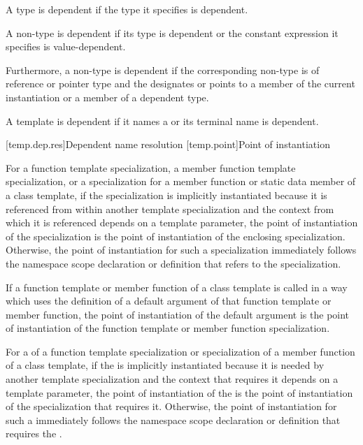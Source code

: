 \pnum
A type
is dependent if the type it specifies is dependent.

\pnum
A non-type
is dependent if its type is dependent or the constant
expression it specifies is value-dependent.

\pnum
Furthermore, a non-type
is dependent if the corresponding non-type 
is of reference or pointer type and the 
designates or points to a member of the current instantiation or a member of
a dependent type.

\pnum
A template  is dependent if
it names a  or
its terminal name is dependent.

[temp.dep.res]{Dependent name resolution}
[temp.point]{Point of instantiation}

\pnum
{}%
For a function template specialization, a member function template
specialization, or a specialization for a member function or static data member
of a class template,
if the specialization is implicitly instantiated because it is referenced
from within another template specialization and
the context from which it is referenced depends on a template parameter,
the point of instantiation of the specialization is the point of instantiation
of the enclosing specialization.
Otherwise, the point of instantiation for such a specialization immediately
follows the namespace scope declaration
or definition that refers to the specialization.

\pnum
If a function template or member function of a class template is called
in a way which uses the definition of a default argument of that function
template or member function,
the point of instantiation of the default argument is the point of
instantiation of the function template or member function specialization.

\pnum
For a  of a function template
specialization or specialization of a member function of a class template, if
the  is implicitly instantiated because
it is needed by another template specialization and the context that requires
it depends on a template parameter, the point of instantiation of the
 is the point of instantiation of the
specialization that requires it. Otherwise, the point of instantiation for such
a  immediately follows the namespace
scope declaration or definition that requires the
.



